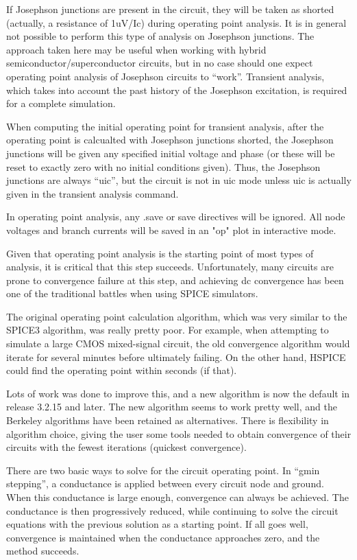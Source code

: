If Josephson junctions are present in the circuit, they will be taken
as shorted (actually, a resistance of 1uV/Ic) during operating
point analysis.  It is in general not possible to perform this type of
analysis on Josephson junctions.  The approach taken here may be
useful when working with hybrid semiconductor/superconductor circuits,
but in no case should one expect operating point analysis of Josephson
circuits to ``work''.  Transient analysis, which takes into account
the past history of the Josephson excitation, is required for a
complete simulation.

When computing the initial operating point for transient analysis,
after the operating point is calcualted with Josephson junctions
shorted, the Josephson junctions will be given any specified initial
voltage and phase (or these will be reset to exactly zero with no
initial conditions given).  Thus, the Josephson junctions are always
``{\vt uic}'', but the circuit is not in {\vt uic} mode unless {\vt
uic} is actually given in the transient analysis command.

In operating point analysis, any {\vt .save} or {\cb save} directives
will be ignored.  All node voltages and branch currents will be saved
in an "op" plot in interactive mode.

Given that operating point analysis is the starting point of most
types of analysis, it is critical that this step succeeds. 
Unfortunately, many circuits are prone to convergence failure at this
step, and achieving dc convergence has been one of the traditional
battles when using SPICE simulators.

The original operating point calculation algorithm, which was very
similar to the SPICE3 algorithm, was really pretty poor.  For example,
when attempting to simulate a large CMOS mixed-signal circuit, the old
convergence algorithm would iterate for several minutes before
ultimately failing.  On the other hand, HSPICE could find the
operating point within seconds (if that).

Lots of work was done to improve this, and a new algorithm is now the
default in release 3.2.15 and later.  The new algorithm seems to work
pretty well, and the Berkeley algorithms have been retained as
alternatives.  There is flexibility in algorithm choice, giving the
user some tools needed to obtain convergence of their circuits with
the fewest iterations (quickest convergence).

There are two basic ways to solve for the circuit operating point.  In
``gmin stepping'', a conductance is applied between every circuit node
and ground.  When this conductance is large enough, convergence can
always be achieved.  The conductance is then progressively reduced,
while continuing to solve the circuit equations with the previous
solution as a starting point.  If all goes well, convergence is
maintained when the conductance approaches zero, and the method
succeeds.

